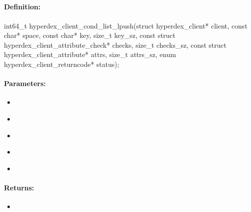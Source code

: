 \pagebreak
\subsection{}
\label{api:c:cond_list_lpush}


\paragraph{Definition:}
\begin{ccode}
int64_t hyperdex_client_cond_list_lpush(struct hyperdex_client* client,
        const char* space,
        const char* key, size_t key_sz,
        const struct hyperdex_client_attribute_check* checks, size_t checks_sz,
        const struct hyperdex_client_attribute* attrs, size_t attrs_sz,
        enum hyperdex_client_returncode* status);
\end{ccode}

\paragraph{Parameters:}
\begin{itemize}[noitemsep]
\item {}\\

\item {}\\

\item {}\\

\item {}\\

\item {}\\

\end{itemize}

\paragraph{Returns:}
\begin{itemize}[noitemsep]
\item {}\\

\end{itemize}


